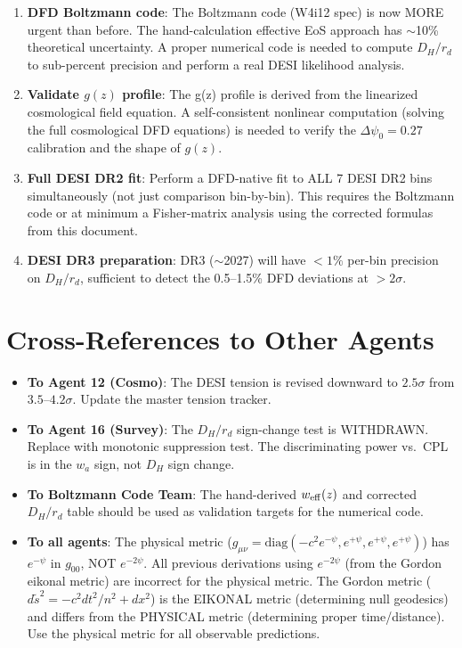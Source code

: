 \documentclass[11pt,a4paper]{article}
\begin{document}
\begin{enumerate}
\item \textbf{DFD Boltzmann code}: The Boltzmann code (W4i12 spec) is now
  MORE urgent than before. The hand-calculation effective EoS approach
  has $\sim$10\% theoretical uncertainty. A proper numerical code is
  needed to compute $D_H/r_d$ to sub-percent precision and perform a
  real DESI likelihood analysis.

\item \textbf{Validate $g(z)$ profile}: The g(z) profile is derived
  from the linearized cosmological field equation. A self-consistent
  nonlinear computation (solving the full cosmological DFD equations)
  is needed to verify the $\Delta\psi_0 = 0.27$ calibration and the
  shape of $g(z)$.

\item \textbf{Full DESI DR2 fit}: Perform a DFD-native fit to ALL
  7 DESI DR2 bins simultaneously (not just comparison bin-by-bin).
  This requires the Boltzmann code or at minimum a Fisher-matrix
  analysis using the corrected formulas from this document.

\item \textbf{DESI DR3 preparation}: DR3 ($\sim$2027) will have
  $<1\%$ per-bin precision on $D_H/r_d$, sufficient to detect the
  0.5--1.5\% DFD deviations at $>2\sigma$.
\end{enumerate}


\section{Cross-References to Other Agents}

\begin{itemize}
\item \textbf{To Agent 12 (Cosmo)}: The DESI tension is revised
  downward to $2.5\sigma$ from $3.5$--$4.2\sigma$. Update the master
  tension tracker.
\item \textbf{To Agent 16 (Survey)}: The $D_H/r_d$ sign-change test
  is WITHDRAWN. Replace with monotonic suppression test.
  The discriminating power vs.\ CPL is in the $w_a$ sign, not $D_H$
  sign change.
\item \textbf{To Boltzmann Code Team}: The hand-derived $w_{\rm eff}(z)$
  and corrected $D_H/r_d$ table should be used as validation targets
  for the numerical code.
\item \textbf{To all agents}: The physical metric
  ($g_{\mu\nu} = \text{diag}(-c^2 e^{-\psi}, e^{+\psi}, e^{+\psi},
  e^{+\psi})$) has $e^{-\psi}$ in $g_{00}$, NOT $e^{-2\psi}$. All
  previous derivations using $e^{-2\psi}$ (from the Gordon eikonal
  metric) are incorrect for the physical metric. The Gordon metric
  ($d\tilde{s}^2 = -c^2 dt^2/n^2 + dx^2$) is the EIKONAL metric
  (determining null geodesics) and differs from the PHYSICAL metric
  (determining proper time/distance). Use the physical metric for all
  observable predictions.
\end{itemize}
\end{document}
